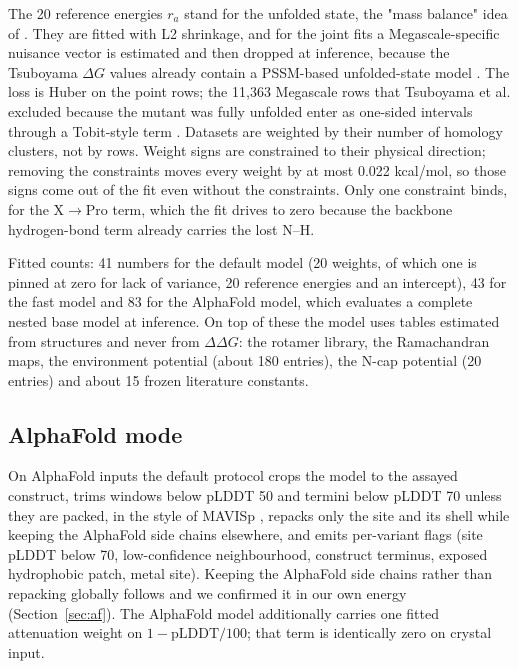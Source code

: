 \documentclass[unnumsec,webpdf,contemporary,large]{oup-authoring-template}
\begin{document}
The 20 reference energies $r_a$ stand for the unfolded state, the "mass balance" idea of \citet{rossi2025}. They
are fitted with L2 shrinkage, and for the joint fits a Megascale-specific nuisance vector is estimated and then
dropped at inference, because the Tsuboyama $\Delta G$ values already contain a PSSM-based unfolded-state model
\citep{tsuboyama2023}. The loss is Huber \citep{huber1964} on the point rows; the 11,363 Megascale rows that
Tsuboyama et al. excluded because the mutant was fully unfolded enter as one-sided intervals through a
Tobit-style term \citep{tobin1958}. Datasets are weighted by their number of homology clusters, not by rows.
Weight signs are constrained to their physical direction; removing the constraints moves every weight by at most
0.022 kcal/mol, so those signs come out of the fit even without the constraints. Only one constraint binds, for the X$\rightarrow$Pro
term, which the fit drives to zero because the backbone hydrogen-bond term already carries the lost N--H.

Fitted counts: 41 numbers for the default model (20 weights, of which one is pinned at zero for lack of variance,
20 reference energies and an intercept), 43 for the fast model and 83 for the AlphaFold model, which evaluates a
complete nested base model at inference. On top of these the model uses tables estimated from structures and
never from $\Delta\Delta G$: the rotamer library, the Ramachandran maps, the environment potential (about 180
entries), the N-cap potential (20 entries) and about 15 frozen literature constants.

\subsection{AlphaFold mode}

On AlphaFold inputs the default protocol crops the model to the assayed construct, trims windows below pLDDT 50
and termini below pLDDT 70 unless they are packed, in the style of MAVISp \citep{arnaudi2026}, repacks only the
site and its shell while keeping the AlphaFold side chains elsewhere, and emits per-variant flags (site pLDDT
below 70, low-confidence neighbourhood, construct terminus, exposed hydrophobic patch, metal site). Keeping the
AlphaFold side chains rather than repacking globally follows \citet{vangaru2025} and we confirmed it in our own
energy (Section~\ref{sec:af}). The AlphaFold model additionally carries one fitted attenuation weight on
$1-\mathrm{pLDDT}/100$; that term is identically zero on crystal input.
\end{document}
